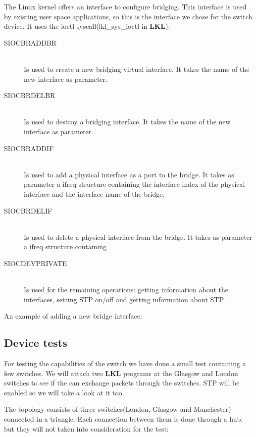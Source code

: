 The Linux kernel offers an interface to configure bridging. This interface is used
by existing user space applications, so this is the interface we chose for the switch device. 
It uses the ioctl syscall(lkl_sys_ioctl in \textbf{LKL}):
\begin{description}
  \item[SIOCBRADDBR] \hfill \\
  Is used to create a new bridging virtual interface. It takes the name of the new interface as parameter.
  \item[SIOCBRDELBR] \hfill \\
  Is used to destroy a bridging interface. It takes the name of the new interface as parameter.
  \item[SIOCBRADDIF] \hfill \\
  Is used to add a physical interface as a port to the bridge. It takes as parameter a ifreq structure containing
the interface index of the physical interface and the interface name of the bridge.
  \item[SIOCBRDELIF] \hfill \\
  Is used to delete a physical interface from the bridge. It takes as parameter a ifreq structure containing
  \item[SIOCDEVPRIVATE] \hfill \\
  Is used for the remaining operations: getting information about the interfaces, setting STP on/off and getting information
about STP.
\end{description}
An example of adding a new bridge interface:

\lstset{language=C,caption=Add bridge,label=lst:cbridgeadd}


\subsection{Device tests}
\label{sub-sec:switch-tests}

For testing the capabilities of the switch we have done a small test containing a few switches. We will attach two \textbf{LKL} programs at the Glasgow and London switches to see if the can exchange packets through the switches. STP will be enabled so we will take a look at it too.

The topology consists of three switches(London, Glasgow and Manchester) connected in a triangle. Each connection between them is done through a hub, but they will not taken into consideration for the test:

